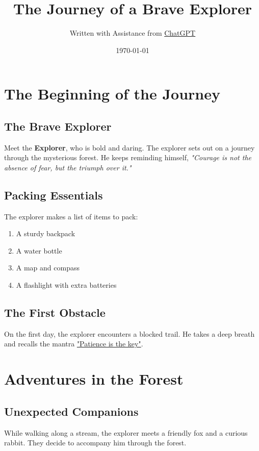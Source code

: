 \documentclass{book}
\title{The Journey of a Brave Explorer}
\author{Written with Assistance from \href{https://chat.openai.com}{ChatGPT}}
\date{\today}
\date{\DTMnow} %
\begin{document}
\maketitle

\tableofcontents

\chapter{The Beginning of the Journey}
\label{chap:beginning}

\section{The Brave Explorer}
\label{sec:explorer}
Meet the \textbf{Explorer}, who is bold and daring. The explorer sets out on a journey through the mysterious forest. He keeps reminding himself, 
\textit{"Courage is not the absence of fear, but the triumph over it."}

\section{Packing Essentials}
\label{sec:packing}
The explorer makes a list of items to pack:
\begin{enumerate}
    \item A sturdy backpack
    \item A water bottle
    \item A map and compass
    \item A flashlight with extra batteries
\end{enumerate}

\section{The First Obstacle}
\label{sec:obstacle}
On the first day, the explorer encounters a blocked trail. He takes a deep breath and recalls the mantra 
\underline{"Patience is the key"}.

\chapter{Adventures in the Forest}
\label{chap:adventure}

\section{Unexpected Companions}
\label{sec:companions}
While walking along a stream, the explorer meets a friendly fox and a curious rabbit. They decide to accompany him through the forest.
\end{document}
